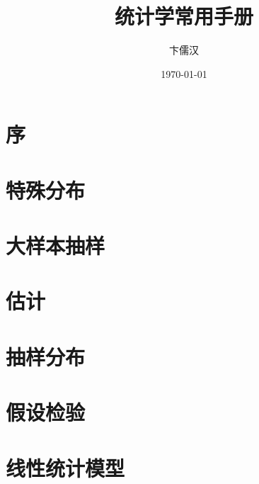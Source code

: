 \documentclass[cn,single]{elegantbook}
\title{统计学常用手册}
\author{卞儒汉}
\date{\today}
\begin{document}

\tableofcontents
%

\chapter*{序}

\chapter{特殊分布}
	
	
	
	
	

\chapter{大样本抽样}
	
	

\chapter{估计}
	

\chapter{抽样分布}
	
	
	
	

\chapter{假设检验}
	
	

\chapter{线性统计模型}
	
\end{document}
